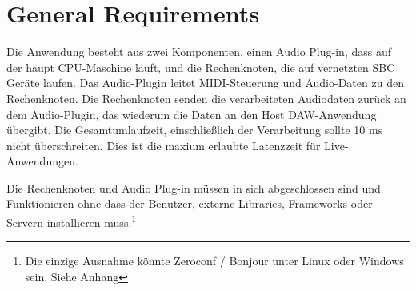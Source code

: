 \section{General Requirements}

Die Anwendung besteht aus zwei Komponenten, einen Audio Plug-in, dass auf der haupt CPU-Maschine lauft, und die Rechenknoten, die auf vernetzten SBC Geräte laufen. Das Audio-Plugin leitet MIDI-Steuerung und Audio-Daten zu den Rechenknoten. Die Rechenknoten senden die verarbeiteten Audiodaten zurück an dem Audio-Plugin, das wiederum die Daten an den Host DAW-Anwendung übergibt. Die Gesamtumlaufzeit, einschließlich der Verarbeitung sollte 10 ms nicht überschreiten. Dies ist die maxium erlaubte Latenzzeit für Live-Anwendungen\cite{AES67-2013}.

Die Rechenknoten und Audio Plug-in müssen in sich abgeschlossen sind und Funktionieren ohne dass der Benutzer, externe Libraries, Frameworks oder Servern installieren muss.\footnote{Die einzige Ausnahme könnte Zeroconf / Bonjour unter Linux oder Windows sein. Siehe Anhang}